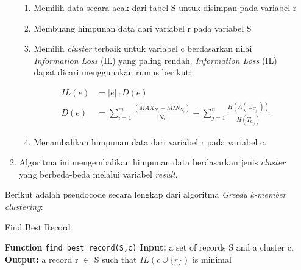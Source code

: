 \documentclass[a4paper,twoside]{article}
\begin{document}
\begin{enumerate}
\begin{enumerate}
\begin{enumerate}
\item Memilih data secara acak dari tabel S untuk disimpan pada variabel r

\item Membuang himpunan data dari variabel r pada variabel S

\item Memilih \textit{cluster} terbaik untuk variabel c berdasarkan nilai \textit{Information Loss} (IL) yang paling rendah. \textit{Information Loss} (IL) dapat dicari menggunakan rumus berikut:

\begin{align*}
IL(e)&= |e| \cdot D(e) \\
D(e) &= \sum_{i=1}^{m} \frac{(MAX_{N_i} - MIN_{N_i})}{|N_i|} + \sum_{j=1}^{n}\frac{H(\Lambda(\cup_{C_j}))}{H(T_{C_j})}
\end{align*}

\item Menambahkan himpunan data dari variabel r pada variabel c.

\end{enumerate}

\item Algoritma ini mengembalikan himpunan data berdasarkan jenis \textit{cluster} yang berbeda-beda melalui variabel \textit{result}.

\end{enumerate}

\noindent Berikut adalah pseudocode secara lengkap dari algoritma \textit{Greedy k-member clustering}:
\begin{tcolorbox}[blanker,width=(\linewidth-0.5cm)]
\begin{algorithm}[H]
  \caption{Find Best Record}\label{alg:1}
  \begin{algorithmic}[1]
  \State \textbf{Function} \texttt{find\_best\_record(S,c)}
  \State \textbf{Input:} a set of records S and a cluster c.
  \State \textbf{Output:} a record r $\in$ S such that $IL(c \cup \{r\})$ is minimal
  \\
  \EndIf
  \EndFor
  \end{algorithmic}
\end{algorithm}
\end{tcolorbox}


\end{enumerate}
\end{document}
